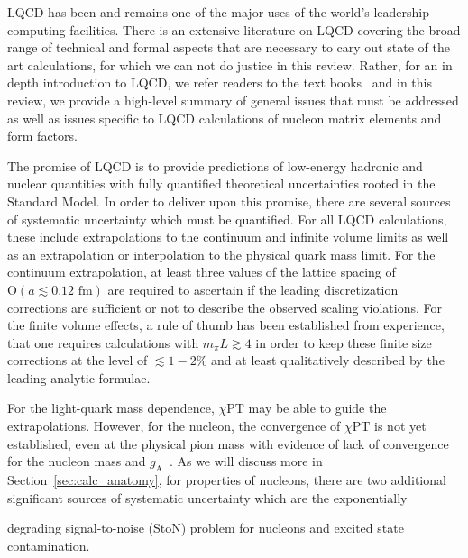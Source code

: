 LQCD has been and remains one of the major uses of the world's leadership computing facilities.
There is an extensive literature on LQCD covering the broad range of technical and formal aspects that are necessary to cary out state of the art calculations, for which we can not do justice in this review.
Rather, for an in depth introduction to LQCD, we refer readers to the text books~\cite{Smit:2002ug,DeGrand:2006zz,Gattringer:2010zz} and in this review, we provide a high-level summary of general issues that must be addressed as well as issues specific to LQCD calculations of nucleon matrix elements and form factors.



The promise of LQCD is to provide predictions of low-energy hadronic and nuclear quantities with fully quantified theoretical uncertainties rooted in the Standard Model.
In order to deliver upon this promise, there are several sources of systematic uncertainty which must be quantified.
For all LQCD calculations, these include extrapolations to the continuum and infinite volume limits as well as an extrapolation or interpolation to the physical quark mass limit.
For the continuum extrapolation, at least three values of the lattice spacing of $\mathrm{O}(a\lesssim0.12\textrm{ fm})$ are required to ascertain if the leading discretization corrections are sufficient or not to describe the observed scaling violations.
For the finite volume effects, a rule of thumb has been established from experience, that one requires calculations with $m_\pi L \gtrsim4$ in order to keep these finite size corrections at the level of $\lesssim1-2\%$ and at least qualitatively described by the leading analytic formulae.%
\begin{marginnote}
\end{marginnote}%
For the light-quark mass dependence, $\chi$PT may be able to guide the extrapolations.
However, for the nucleon, the convergence of $\chi$PT is not yet established, even at the physical pion mass with evidence of lack of convergence for the nucleon mass and $g_{\mathrm{A}}$~\cite{Chang:2018uxx,Walker-Loud:2019cif}.
As we will discuss more in Section~\ref{sec:calc_anatomy}, for properties of nucleons, there are two additional significant sources of systematic uncertainty which are the exponentially%
\begin{marginnote}
\end{marginnote}%
degrading signal-to-noise (StoN) problem for nucleons and excited state contamination.



